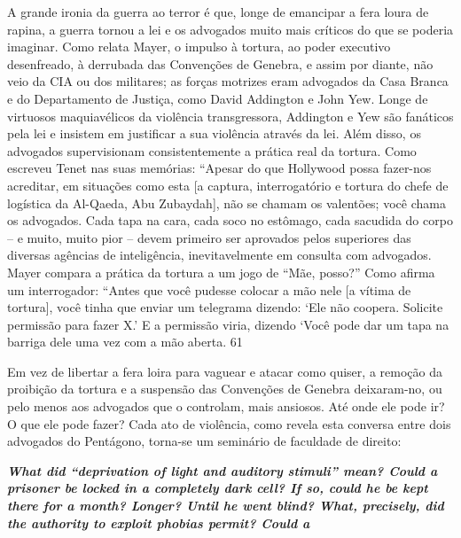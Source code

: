  
\par
 
A grande ironia da guerra ao terror é que, longe de emancipar a fera loura de rapina, a guerra tornou a lei e os advogados muito mais críticos do que se poderia imaginar. Como relata Mayer, o impulso à tortura, ao poder executivo desenfreado, à derrubada das Convenções de Genebra, e assim por diante, não veio da CIA ou dos militares; as forças motrizes eram advogados da Casa Branca e do Departamento de Justiça, como David Addington e John Yew. Longe de virtuosos maquiavélicos da violência transgressora, Addington e Yew são fanáticos pela lei e insistem em justificar a sua violência através da lei. Além disso, os advogados supervisionam consistentemente a prática real da tortura. Como escreveu Tenet nas suas memórias: “Apesar do que Hollywood possa fazer-nos acreditar, em situações como esta [a captura, interrogatório e tortura do chefe de logística da Al-Qaeda, Abu Zubaydah], não se chamam os valentões; você chama os advogados. Cada tapa na cara, cada soco no estômago, cada sacudida do corpo – e muito, muito pior – devem primeiro ser aprovados pelos superiores das diversas agências de inteligência, inevitavelmente em consulta com advogados. Mayer compara a prática da tortura a um jogo de “Mãe, posso?” Como afirma um interrogador: “Antes que você pudesse colocar a mão nele [a vítima de tortura], você tinha que enviar um telegrama dizendo: ‘Ele não coopera. Solicite permissão para fazer X.’ E a permissão viria, dizendo ‘Você pode dar um tapa na barriga dele uma vez com a mão aberta.
 {\color{blue} 61}  

 
\par
 
Em vez de libertar a fera loira para vaguear e atacar como quiser, a remoção da proibição da tortura e a suspensão das Convenções de Genebra deixaram-no, ou pelo menos aos advogados que o controlam, mais ansiosos. Até onde ele pode ir? O que ele pode fazer? Cada ato de violência, como revela esta conversa entre dois advogados do Pentágono, torna-se um seminário de faculdade de direito:
 
\par
 

 \textbf{\textit{What did “deprivation of light and auditory stimuli” mean? Could a prisoner be locked in a completely dark cell? If so, could he be kept there for a month? Longer? Until he went blind? What, precisely, did the authority to exploit phobias permit? Could a} }  
 
 
\par
 

